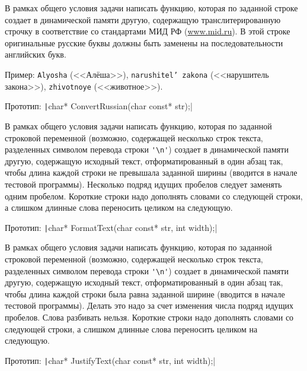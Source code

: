 \begin{zztask}
В рамках общего условия задачи написать функцию, которая по заданной строке
создает в динамической памяти другую, содержащую транслитерированную
строчку в соответствие со стандартами МИД РФ (\url{www.mid.ru}).
В этой строке оригинальные русские буквы должны быть заменены на
последовательности английских букв.

Пример:
\texttt{Alyosha} (<<Алёша>>), \texttt{narushitel{'} zakona}
(<<нарушитель закона>>), \texttt{zhivotnoye} (<<животное>>).

Прототип: \texttt|char* ConvertRussian(char const* str);|
\end{zztask}

\begin{zztask}
В рамках общего условия задачи написать функцию, которая по заданной строковой
переменной (возможно, содержащей несколько строк текста, разделенных символом
перевода строки \verb|'\n'|) создает в динамической памяти другую, содержащую
исходный текст, отформатированный в один абзац так, чтобы длина каждой
строки не превышала заданной ширины (вводится в начале тестовой программы).
Несколько подряд идущих пробелов следует заменять одним пробелом.
Короткие строки надо дополнять словами со следующей строки, а слишком
длинные слова переносить целиком на следующую.

Прототип: \texttt|char* FormatText(char const* str, int width);|
\end{zztask}

\begin{zztask}
В рамках общего условия задачи написать функцию, которая по заданной строковой
переменной (возможно, содержащей несколько строк текста, разделенных символом
перевода строки \verb|'\n'|) создает в динамической памяти другую, содержащую
исходный текст, отформатированный в один абзац так, чтобы длина каждой
строки была равна заданной ширине (вводится в начале тестовой программы).
Делать это надо за счет изменения числа подряд идущих пробелов. Слова
разбивать нельзя. Короткие строки надо дополнять словами со следующей
строки, а слишком длинные слова переносить целиком на следующую.

Прототип: \texttt|char* JustifyText(char const* str, int width);|
\end{zztask}
